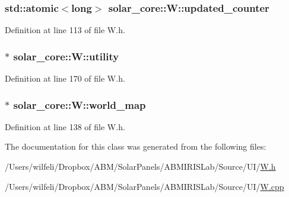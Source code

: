 \hypertarget{classsolar__core_1_1_w_a775d817c6117b462571c3fca62fe0c86}{}
\subsubsection[{updated\+\_\+counter}]{\setlength{\rightskip}{0pt plus 5cm}std\+::atomic$<$long$>$ solar\+\_\+core\+::\+W\+::updated\+\_\+counter}\label{classsolar__core_1_1_w_a775d817c6117b462571c3fca62fe0c86}


Definition at line 113 of file W.\+h.

\hypertarget{classsolar__core_1_1_w_a6d6fa51d4bdc40dac8b76aa4967030b5}{}
\subsubsection[{utility}]{$\ast$ solar\+\_\+core\+::\+W\+::utility}\label{classsolar__core_1_1_w_a6d6fa51d4bdc40dac8b76aa4967030b5}


Definition at line 170 of file W.\+h.

\hypertarget{classsolar__core_1_1_w_a8ed6f1aa7fd4ef2c3488147b38a670b7}{}
\subsubsection[{world\+\_\+map}]{$\ast$ solar\+\_\+core\+::\+W\+::world\+\_\+map}\label{classsolar__core_1_1_w_a8ed6f1aa7fd4ef2c3488147b38a670b7}


Definition at line 138 of file W.\+h.



The documentation for this class was generated from the following files\+:\begin{DoxyCompactItemize}
\item 
/\+Users/wilfeli/\+Dropbox/\+A\+B\+M/\+Solar\+Panels/\+A\+B\+M\+I\+R\+I\+S\+Lab/\+Source/\+U\+I/\hyperlink{_w_8h}{W.\+h}\item 
/\+Users/wilfeli/\+Dropbox/\+A\+B\+M/\+Solar\+Panels/\+A\+B\+M\+I\+R\+I\+S\+Lab/\+Source/\+U\+I/\hyperlink{_w_8cpp}{W.\+cpp}\end{DoxyCompactItemize}
